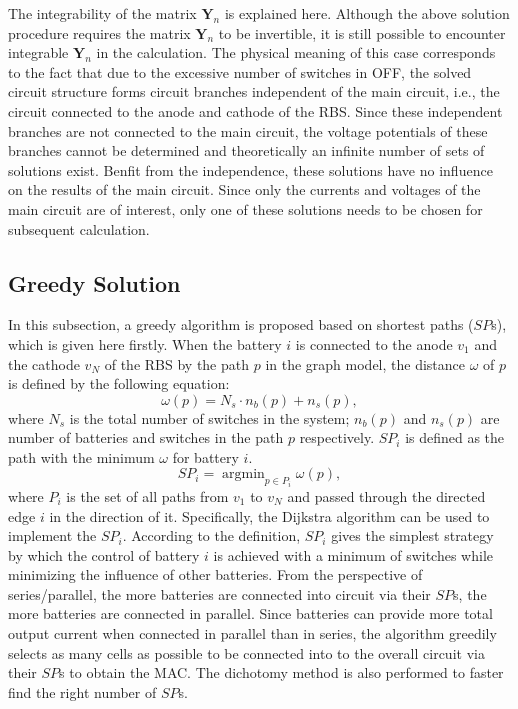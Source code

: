 \documentclass{article}
\begin{document}
The integrability of the matrix $\bm{Y}_n$ is explained here.
Although the above solution procedure requires the matrix $\bm{Y}_n$ to be invertible, it is still possible to encounter integrable $\bm{Y}_n$ in the calculation.
The physical meaning of this case corresponds to the fact that due to the excessive number of switches in OFF, the solved circuit structure forms circuit branches independent of the main circuit, i.e., the circuit connected to the anode and cathode of the RBS. 
Since these independent branches are not connected to the main circuit, the voltage potentials of these branches cannot be determined and theoretically an infinite number of sets of solutions exist. 
Benfit from the independence, these solutions have no influence on the results of the main circuit. 
Since only the currents and voltages of the main circuit are of interest, only one of these solutions needs to be chosen for subsequent calculation.

\subsection{Greedy Solution}\label{subsec:greedy_solution}

In this subsection, a greedy algorithm is proposed based on shortest paths ($SP$s), which is given here firstly.
When the battery $i$ is connected to the anode $v_1$ and the cathode $v_N$ of the RBS by the path $p$ in the graph model, the distance $\omega$ of $p$ is defined by the following equation:
\begin{equation}\label{eq:weight}
    \omega(p) = N_s \cdot n_b (p) + n_s (p),
\end{equation}
where $N_s$ is the total number of switches in the system; $n_b(p)$ and $n_s(p)$ are number of batteries and switches in the path $p$ respectively.
$SP_i$ is defined as the path with the minimum $\omega$ for battery $i$.
\begin{equation}\label{eq:def_sp}
    SP_i = \mathop{\arg\min}_{p \in P_i} \omega(p),
\end{equation}
where $P_i$ is the set of all paths from $v_1$ to $v_N$ and passed through the directed edge $i$ in the direction of it.
Specifically, the Dijkstra algorithm can be used to implement the $SP_i$.
According to the definition, $SP_i$ gives the simplest strategy by which the control of battery $i$ is achieved with a minimum of switches while minimizing the influence of other batteries.
From the perspective of series/parallel, the more batteries are connected into circuit via their $SP$s, the more batteries are connected in parallel.
Since batteries can provide more total output current when connected in parallel than in series, the algorithm greedily selects as many cells as possible to be connected into to the overall circuit via their $SP$s to obtain the MAC.
The dichotomy method is also performed to faster find the right number of $SP$s.
\end{document}
